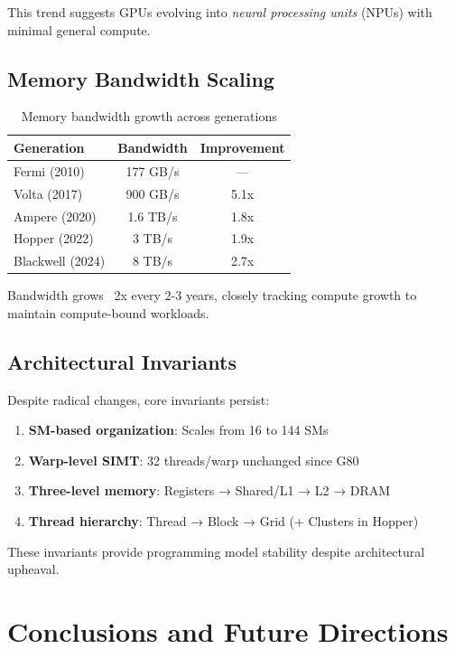 \documentclass{article}
\begin{document}
This trend suggests GPUs evolving into \textit{neural processing units} (NPUs) with minimal general compute.

\subsection{Memory Bandwidth Scaling}

\begin{table}[h]
\centering
\small
\begin{tabular}{lcc}
\toprule
Generation & Bandwidth & Improvement \\
\midrule
Fermi (2010) & 177 GB/s & — \\
Volta (2017) & 900 GB/s & 5.1x \\
Ampere (2020) & 1.6 TB/s & 1.8x \\
Hopper (2022) & 3 TB/s & 1.9x \\
Blackwell (2024) & 8 TB/s & 2.7x \\
\bottomrule
\end{tabular}
\caption{Memory bandwidth growth across generations}
\end{table}

Bandwidth grows ~2x every 2-3 years, closely tracking compute growth to maintain compute-bound workloads.

\subsection{Architectural Invariants}

Despite radical changes, core invariants persist:
\begin{enumerate}
\item \textbf{SM-based organization}: Scales from 16 to 144 SMs
\item \textbf{Warp-level SIMT}: 32 threads/warp unchanged since G80
\item \textbf{Three-level memory}: Registers → Shared/L1 → L2 → DRAM
\item \textbf{Thread hierarchy}: Thread → Block → Grid (+ Clusters in Hopper)
\end{enumerate}

These invariants provide programming model stability despite architectural upheaval.

\section{Conclusions and Future Directions}
\end{document}
